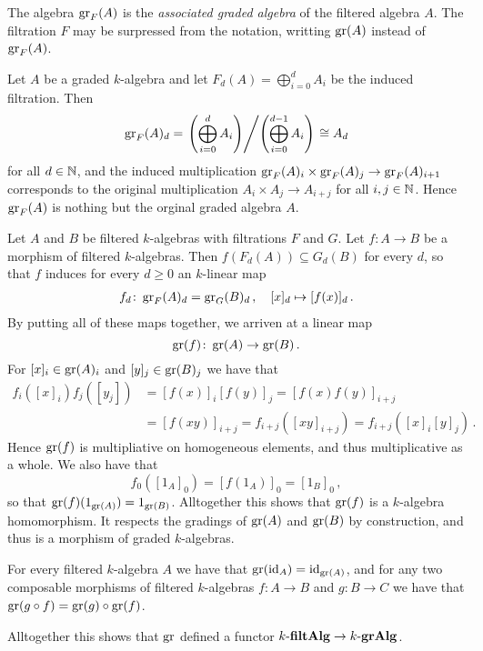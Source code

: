\begin{fluff}
  The algebra $\operatorname{gr}_F(A)$ is the \emph{associated graded algebra} of the filtered algebra $A$.
  The filtration $F$ may be surpressed from the notation, writting $\operatorname{gr}(A)$ instead of $\operatorname{gr}_F(A)$.
\end{fluff}


\begin{example}
  Let $A$ be a graded $k$-algebra and let $F_d(A) = \bigoplus_{i=0}^d A_i$ be the induced filtration.
  Then
  \[
          \operatorname{gr}_F(A)_d
    =     \left.
            \left( \bigoplus_{i=0}^d A_i \right)
          \middle/
            \left( \bigoplus_{i=0}^{d-1} A_i \right)
          \right.
    \cong A_d
  \]
  for all $d \in \mathbb{N}$, and the induced multiplication $\operatorname{gr}_F(A)_i \times \operatorname{gr}_F(A)_j \to \operatorname{gr}_F(A)_{i+1}$ corresponds to the original multiplication $A_i \times A_j \to A_{i+j}$ for all $i, j \in \mathbb{N}$.
  Hence $\operatorname{gr}_F(A)$ is nothing but the orginal graded algebra $A$.
\end{example}


\begin{remark}
  Let $A$ and $B$ be filtered $k$-algebras with filtrations $F$ and $G$.
  Let $f \colon A \to B$ be a morphism of filtered $k$-algebras.
  Then $f(F_d(A)) \subseteq G_d(B)$ for every $d$, so that $f$ induces for every $d \geq 0$ an $k$-linear map
  \begin{align*}
            f_d
    \colon  \operatorname{gr}_F(A)_d
    =       \operatorname{gr}_G(B)_d \,,
    \quad   [x]_d
    \mapsto [f(x)]_d \,.
  \end{align*}
  By putting all of these maps together, we arriven at a linear map
  \[
            \operatorname{gr}(f)
    \colon  \operatorname{gr}(A)
    \to     \operatorname{gr}(B) \,.
  \]
  For $[x]_i \in \operatorname{gr}(A)_i$ and $[y]_j \in \operatorname{gr}(B)_j$ we have that
  \begin{align*}
        f_i([x]_i) f_j([y_j])
    &=  [f(x)]_i [f(y)]_j
     =  [f(x) f(y)]_{i+j} \\
    &=  [f(xy)]_{i+j}
     =  f_{i+j}([xy]_{i+j})
     =  f_{i+j}([x]_i [y]_j) \,.
  \end{align*}
  Hence $\operatorname{gr}(f)$ is multipliative on homogeneous elements, and thus multiplicative as a whole.
  We also have that
  \[
      f_0([1_A]_0)
    = [f(1_A)]_0
    = [1_B]_0 \,,
  \]
  so that $\operatorname{gr}(f)(1_{\operatorname{gr}(A)}) = 1_{\operatorname{gr}(B)}$.
  Alltogether this shows that $\operatorname{gr}(f)$ is a $k$-algebra homomorphism.
  It respects the gradings of $\operatorname{gr}(A)$ and $\operatorname{gr}(B)$ by construction, and thus is a morphism of graded $k$-algebras.
  
  For every filtered $k$-algebra $A$ we have that $\operatorname{gr}(\operatorname{id}_A) = \operatorname{id}_{\operatorname{gr}(A)}$, and for any two composable morphisms of filtered $k$-algebras $f \colon A \to B$ and $g \colon B \to C$ we have that $\operatorname{gr}(g \circ f) = \operatorname{gr}(g) \circ \operatorname{gr}(f)$.
  
  Alltogether this shows that $\operatorname{gr}$ defined a functor $k\text{-}\mathbf{filtAlg} \to k\text{-}\mathbf{grAlg}$.
\end{remark}


